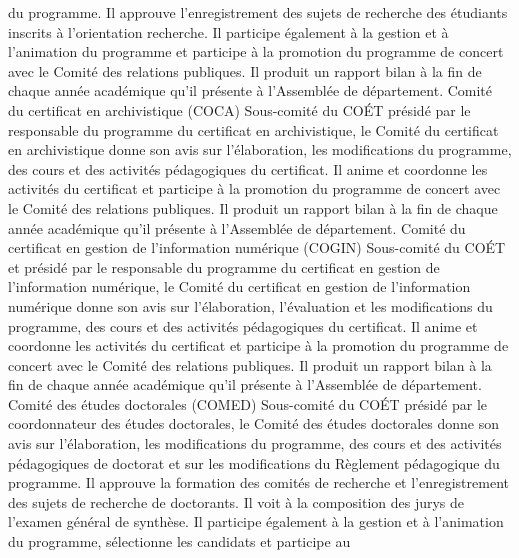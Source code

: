 \documentclass [12 pt]{article}
\begin{document}
                du programme. Il approuve l'enregistrement des sujets de recherche des étudiants
                inscrits à l'orientation recherche. Il participe également à la gestion et à
                l'animation du programme et participe à la promotion du programme de concert avec le
                Comité des relations publiques. Il produit un rapport bilan à la fin de chaque année
                académique qu'il présente à l'Assemblée de département.
            Comité du certificat en archivistique (COCA)
            Sous-comité du COÉT présidé par le responsable du programme du certificat en
                archivistique, le Comité du certificat en archivistique donne son avis sur
                l'élaboration, les modifications du programme, des cours et des activités
                pédagogiques du certificat. Il anime et coordonne les activités du certificat et
                participe à la promotion du programme de concert avec le Comité des relations
                publiques. Il produit un rapport bilan à la fin de chaque année académique qu'il
                présente à l'Assemblée de département.
            Comité du certificat en gestion de l'information numérique (COGIN)
            Sous-comité du COÉT et présidé par le responsable du programme du certificat en
                gestion de l'information numérique, le Comité du certificat en gestion de
                l'information numérique donne son avis sur l'élaboration, l'évaluation et les
                modifications du programme, des cours et des activités pédagogiques du certificat.
                Il anime et coordonne les activités du certificat et participe à la promotion du
                programme de concert avec le Comité des relations publiques. Il produit un rapport
                bilan à la fin de chaque année académique qu'il présente à l'Assemblée de
                département.
            Comité des études doctorales (COMED)
            Sous-comité du COÉT présidé par le coordonnateur des études doctorales, le Comité des
                études doctorales donne son avis sur l'élaboration, les modifications du programme,
                des cours et des activités pédagogiques de doctorat et sur les modifications du
                Règlement pédagogique du programme. Il approuve la formation des comités de
                recherche et l'enregistrement des sujets de recherche de doctorants. Il voit à la
                composition des jurys de l'examen général de synthèse. Il participe également à la
                gestion et à l'animation du programme, sélectionne les candidats et participe au
\end{document}
